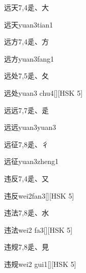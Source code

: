 \begin{entry}{远天}{7,4}{⾡、⼤}
  \begin{phonetics}{远天}{yuan3tian1}
  \end{phonetics}
\end{entry}

\begin{entry}{远方}{7,4}{⾡、⽅}
  \begin{phonetics}{远方}{yuan3fang1}
  \end{phonetics}
\end{entry}

\begin{entry}{远处}{7,5}{⾡、⼡}
  \begin{phonetics}{远处}{yuan3 chu4}[][HSK 5]
  \end{phonetics}
\end{entry}

\begin{entry}{远远}{7,7}{⾡、⾡}
  \begin{phonetics}{远远}{yuan3yuan3}
  \end{phonetics}
\end{entry}

\begin{entry}{远征}{7,8}{⾡、⼻}
  \begin{phonetics}{远征}{yuan3zheng1}
  \end{phonetics}
\end{entry}

\begin{entry}{违反}{7,4}{⾡、⼜}
  \begin{phonetics}{违反}{wei2fan3}[][HSK 5]
  \end{phonetics}
\end{entry}

\begin{entry}{违法}{7,8}{⾡、⽔}
  \begin{phonetics}{违法}{wei2 fa3}[][HSK 5]
  \end{phonetics}
\end{entry}

\begin{entry}{违规}{7,8}{⾡、⾒}
  \begin{phonetics}{违规}{wei2 gui1}[][HSK 5]
  \end{phonetics}
\end{entry}

